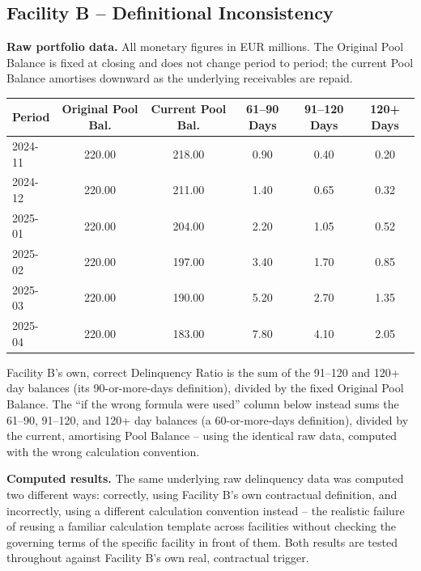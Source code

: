 \documentclass[11pt,a4paper]{article}
\begin{document}
\subsection{Facility B -- Definitional Inconsistency}

\textbf{Raw portfolio data.} All monetary figures in EUR millions. The Original Pool Balance is fixed at closing and does not change period to period; the current Pool Balance amortises downward as the underlying receivables are repaid.

\begin{center}
\renewcommand{\arraystretch}{1.25}
\small
\begin{tabular}{@{}lccccc@{}}
\toprule
\textbf{Period} & \textbf{Original Pool Bal.} & \textbf{Current Pool Bal.} & \textbf{61--90 Days} & \textbf{91--120 Days} & \textbf{120+ Days} \\
\midrule
2024-11 & 220.00 & 218.00 & 0.90 & 0.40 & 0.20 \\
2024-12 & 220.00 & 211.00 & 1.40 & 0.65 & 0.32 \\
2025-01 & 220.00 & 204.00 & 2.20 & 1.05 & 0.52 \\
2025-02 & 220.00 & 197.00 & 3.40 & 1.70 & 0.85 \\
2025-03 & 220.00 & 190.00 & 5.20 & 2.70 & 1.35 \\
2025-04 & 220.00 & 183.00 & 7.80 & 4.10 & 2.05 \\
\bottomrule
\end{tabular}
\end{center}

Facility B's own, correct Delinquency Ratio is the sum of the 91--120 and 120+ day balances (its 90-or-more-days definition), divided by the fixed Original Pool Balance. The ``if the wrong formula were used'' column below instead sums the 61--90, 91--120, and 120+ day balances (a 60-or-more-days definition), divided by the current, amortising Pool Balance -- using the identical raw data, computed with the wrong calculation convention.

\textbf{Computed results.} The same underlying raw delinquency data was computed two different ways: correctly, using Facility B's own contractual definition, and incorrectly, using a different calculation convention instead -- the realistic failure of reusing a familiar calculation template across facilities without checking the governing terms of the specific facility in front of them. Both results are tested throughout against Facility B's own real, contractual trigger.
\end{document}
